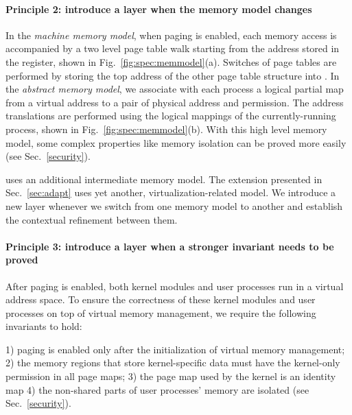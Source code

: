 \paragraph{Principle 2: introduce a layer when the memory model changes}
In the \emph{machine memory model}, when paging is enabled, each memory
access is accompanied by a two level page table walk starting from the
address stored in the  register, shown in Fig.~\ref{fig:spec:memmodel}(a). Switches of page tables are
performed by storing the top address of the other page table structure
into .
In the \emph{abstract memory model}, we associate with each process a logical
partial map from a virtual address to a pair of physical address and
permission. The address translations are performed using the logical
mappings of the currently-running process, shown in Fig.~\ref{fig:spec:memmodel}(b).
With this high level memory model, some complex properties like
memory isolation can be proved more easily
(see Sec.~\ref{security}).

\mCTOSbase{} uses an additional intermediate memory model.
The \mCTOShyper{} extension presented in Sec.~\ref{sec:adapt}
uses yet another, virtualization-related model.
We introduce a new layer whenever we switch
from one memory model to another
and establish the contextual refinement between them.



\paragraph{Principle 3: introduce a layer when a stronger invariant needs to be proved}

After paging is enabled, both kernel modules and user processes
run in a virtual address space.
To ensure the correctness of these kernel modules and user processes on top of virtual memory
management, we require the following invariants to hold:
\begin{invariant}
\label{inv:virtual}
1) paging is enabled only after the initialization of virtual memory management;
2) the memory regions that store kernel-specific data must have the kernel-only 
permission in all page maps;
3) the page map used by the kernel is an identity map
4) the non-shared parts of user processes' memory are isolated (see 
Sec.~\ref{security}).
\end{invariant}

